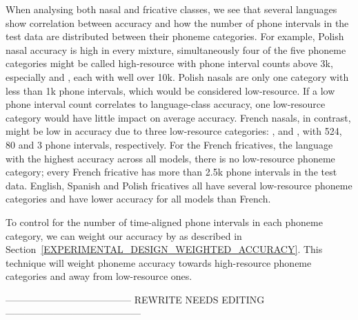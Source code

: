 When analysing both nasal and fricative classes, we see that several languages show correlation between accuracy and how the number of phone intervals in the test data are distributed between their phoneme categories. For example, Polish nasal accuracy is high in every mixture, simultaneously four of the five phoneme categories might be called high-resource with phone interval counts above 3k, especially \textipa{|[{n}} and , each with well over 10k. Polish nasals are only one category with less than 1k phone intervals, which would be considered low-resource. If a low phone interval count correlates to language-class accuracy, one low-resource category would have little impact on average accuracy. French nasals, in contrast, might be low in accuracy due to three low-resource categories: \textipa{\textltailn},  and , with 524, 80 and 3 phone intervals, respectively. For the French fricatives, the language with the highest accuracy across all models, there is no low-resource phoneme category; every French fricative has more than 2.5k phone intervals in the test data. English, Spanish and Polish fricatives all have several low-resource phoneme categories and have lower accuracy for all models than French.

To control for the number of time-aligned phone intervals in each phoneme category, we can weight our accuracy by as described in Section~\ref{EXPERIMENTAL_DESIGN_WEIGHTED_ACCURACY}. This technique will weight phoneme accuracy towards high-resource phoneme categories and away from low-resource ones.

--------------------------------------- REWRITE NEEDS EDITING ------------------------------------------
\fi




